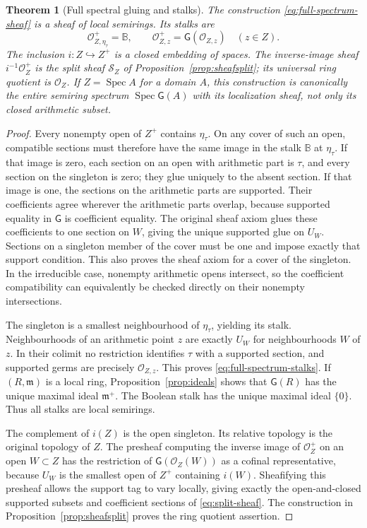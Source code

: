\documentclass[11pt,a4paper]{article}
\newtheorem{theorem}{Theorem}[section]
\theoremstyle{definition}\newtheorem{definition}[theorem]{Definition}
\newcommand{\Spec}{\operatorname{Spec}}\newcommand{\SpecMon}{\operatorname{Spec}_{\mathrm{mon}}}
\newcommand{\G}{\mathsf G}\newcommand{\Tor}{\operatorname{Tor}}\newcommand{\Frac}{\operatorname{Frac}}
\begin{document}
\begin{theorem}[Full spectral gluing and stalks]\label{thm:fullspectral}
The construction \eqref{eq:full-spectrum-sheaf} is a sheaf of local
semirings. Its stalks are
\[
 \mathcal O_{Z,\eta_\tau}^+=\mathbb B,\qquad
 \mathcal O_{Z,z}^+=\G(\mathcal O_{Z,z})\quad(z\in Z).
 \tag{AV6.6}\label{eq:full-spectrum-stalks}
\]
The inclusion $i:Z\hookrightarrow Z^+$ is a closed embedding of spaces.
The inverse-image sheaf $i^{-1}\mathcal O_Z^+$ is the split sheaf
$\mathcal S_Z$ of Proposition~\ref{prop:sheafsplit}; its universal
ring quotient is $\mathcal O_Z$.
If $Z=\Spec A$ for a domain $A$, this construction is canonically the
entire semiring spectrum $\Spec\G(A)$ with its localization sheaf,
not only its closed arithmetic subset.
\end{theorem}
\begin{proof}
Every nonempty open of $Z^+$ contains $\eta_\tau$. On any cover of such
an open, compatible sections must therefore have the same image in
the stalk $\mathbb B$ at $\eta_\tau$. If that image is zero, each section
on an open with arithmetic part is $\tau$, and every section on the
singleton is zero; they glue uniquely to the absent section. If that
image is one, the sections on the arithmetic parts are supported.
Their coefficients agree wherever the arithmetic parts overlap,
because supported equality in $\G$ is coefficient equality. The
original sheaf axiom glues these coefficients to one section on $W$,
giving the unique supported glue on $U_W$. Sections on a singleton
member of the cover must be one and impose exactly that support
condition. This also proves the sheaf axiom for a cover of the
singleton. In the irreducible case, nonempty arithmetic opens intersect,
so the coefficient compatibility can equivalently be checked directly
on their nonempty intersections.

The singleton is a smallest neighbourhood of $\eta_\tau$, yielding
its stalk. Neighbourhoods of an arithmetic point $z$ are exactly $U_W$
for neighbourhoods $W$ of $z$. In their colimit no restriction identifies
$\tau$ with a supported section, and supported germs are precisely
$\mathcal O_{Z,z}$. This proves \eqref{eq:full-spectrum-stalks}.
If $(R,\mathfrak m)$ is a local ring, Proposition~\ref{prop:ideals}
shows that $\G(R)$ has the unique maximal ideal $\mathfrak m^+$.
The Boolean stalk has the unique maximal ideal $\{0\}$.
Thus all stalks are local semirings.

The complement of $i(Z)$ is the open singleton. Its relative topology
is the original topology of $Z$. The presheaf computing the inverse
image of $\mathcal O_Z^+$ on an open $W\subset Z$ has the restriction
of $\G(\mathcal O_Z(W))$ as a cofinal representative, because $U_W$
is the smallest open of $Z^+$ containing $i(W)$. Sheafifying this
presheaf allows the support tag to vary locally, giving exactly the
open-and-closed supported subsets and coefficient sections of
\eqref{eq:split-sheaf}. The construction in
Proposition~\ref{prop:sheafsplit} proves the ring quotient assertion.


\end{proof}
\end{document}
